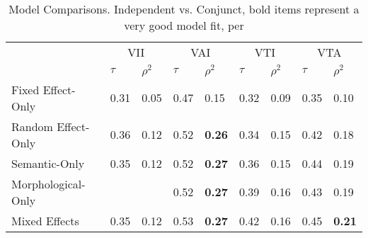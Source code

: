         \begin{table}[h!]
            \centering
            \begin{tabular}{lllllllll}
            \toprule
            & \multicolumn{2}{c}{VII}                          & \multicolumn{2}{c}{VAI}                          & \multicolumn{2}{c}{VTI}          & \multicolumn{2}{c}{VTA}                         \\
            & $\tau$      &$\rho^{2}$      & $\tau$      &$\rho^{2}$ & $\tau$           &$\rho^{2}$      & $\tau$      &$\rho^{2}$ \\
            \midrule
            Fixed Effect-Only  & 0.31 & 0.05 & 0.47 & 0.15          & 0.32 & 0.09 & 0.35 &  0.10 \\
            Random Effect-Only & 0.36 & 0.12 & 0.52 & \textbf{0.26} & 0.34 & 0.15 & 0.42 & 0.18 \\
            Semantic-Only      & 0.35 & 0.12 & 0.52 & \textbf{0.27} & 0.36 & 0.15 & 0.44 & 0.19 \\
            Morphological-Only &      &       &0.52 & \textbf{0.27} & 0.39 & 0.16 & 0.43 & 0.19 \\
            Mixed Effects      & 0.35 & 0.12 & 0.53 & \textbf{0.27} & 0.42 & 0.16 & 0.45 & \textbf{0.21} \\


            \bottomrule
            \end{tabular}
            \caption{
               Model Comparisons. Independent vs. Conjunct, bold items represent a very good model fit, per \citet{mcfadden1973conditional} \\ \label{tab:randvsfullivc}
              }
        \end{table}


